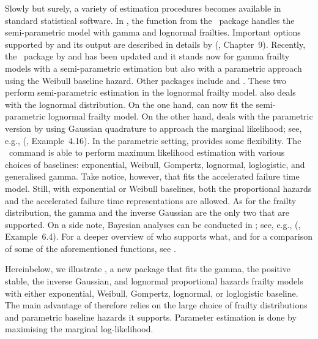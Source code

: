 Slowly but surely, a variety of estimation procedures becomes available in standard statistical software.
In  \citep{R}, the  function from the ~package \citep{R:survival}
  handles the semi-parametric model with gamma and lognormal frailties.
Important options supported by  and its output are described in details by 
  \citeauthor{TherneauGrambsch00} (\citeyear{TherneauGrambsch00}, Chapter~9).
Recently, the ~package \citep{R:frailtypack} by \cite{RondeauGonzales05}
  and \cite{RondeauEtal12} has been updated and it stands now for gamma frailty models
  with a semi-parametric estimation but also with a parametric approach using the Weibull baseline hazard.
Other  packages include  \citep{R:coxme} and  \citep{R:phmm}. 
These two perform semi-parametric estimation in the lognormal frailty model.
 \citep{SAS} also deals with the lognormal distribution. 
On the one hand,  can now fit the semi-parametric lognormal frailty model.
On the other hand,  deals with the parametric version by using Gaussian quadrature to approach the marginal likelihood;
  see, e.g., \citeauthor{DuchateauJanssen08} (\citeyear{DuchateauJanssen08}, Example~4.16).
In the parametric setting,  \citep{STATA} provides some flexibility.
The ~command \citep{Gutierrez02} is able to perform maximum likelihood estimation 
  with various choices of baselines:
  exponential, Weibull, Gompertz, lognormal, loglogistic, and generalised gamma.
Take notice, however, that  fits the accelerated failure time model.
Still, with exponential or Weibull baselines, both the proportional hazards and the accelerated failure time
  representations are allowed.   
As for the frailty distribution, the gamma and the inverse Gaussian are the only two that are supported.
On a side note, Bayesian analyses can be conducted in  \citep{Winbugs};
  see, e.g., \citeauthor{DuchateauJanssen08} (\citeyear{DuchateauJanssen08}, Example~6.4).
For a deeper overview of who supports what, and for a comparison of some of the aforementioned functions,
  see \cite{WienkeHirsch11}.


Hereinbelow, we illustrate  \citep{R:parfm}, a new  package that fits 
    the gamma, the positive stable, the inverse Gaussian, and lognormal
    proportional hazards frailty models 
    with either exponential, Weibull, Gompertz, lognormal, 
    or loglogistic baseline.
The main advantage of  therefore relies on the large choice 
  of frailty distributions and parametric baseline hazards it supports.
Parameter estimation is done by maximising the marginal log-likelihood.

